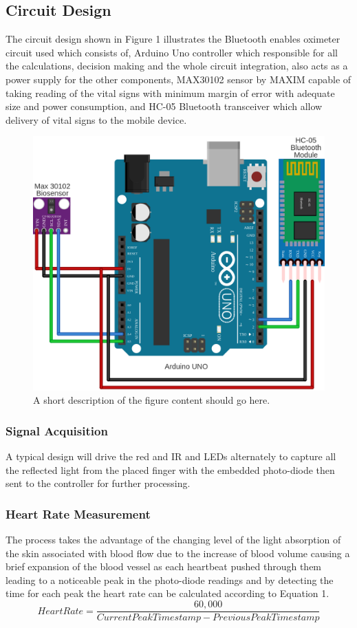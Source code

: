 \documentclass{bmcart}
\begin{document}
\subsection*{Circuit Design}
The circuit design shown in Figure 1 illustrates the Bluetooth enables oximeter
circuit used which consists of,  Arduino Uno controller which responsible for
all the calculations, decision making and the whole circuit integration, also
acts as a power supply for the other components, MAX30102 sensor by MAXIM
capable of taking reading of the vital signs with minimum margin of error with
adequate size and power consumption, and  HC-05 Bluetooth transceiver which
allow delivery of vital signs to the mobile device.

\begin{figure}[h!]
  \includegraphics[width=.75\linewidth]{png_images/circuit_desing.png}
  \caption{
      A short description of the figure content should go here.}
\end{figure}
\FloatBarrier

\subsubsection*{Signal Acquisition}
A typical design will drive the red and IR and LEDs alternately to capture all
the reflected light from the placed finger with the embedded photo-diode then
sent to the controller for further processing.\\

\subsubsection*{Heart Rate Measurement}
The process takes the advantage of the changing level of the light absorption of
the skin associated with blood flow due to the increase of blood volume causing
a brief expansion of the blood vessel as each heartbeat pushed through them
leading to a noticeable peak in the photo-diode readings and by detecting the
time for each peak the heart rate can be calculated according to Equation 1.\\
%
\[
 Heart Rate = \frac{60,000}{Current Peak Timestamp - Previous Peak Timestamp}
 \tag{1}
\]
%
\end{document}
